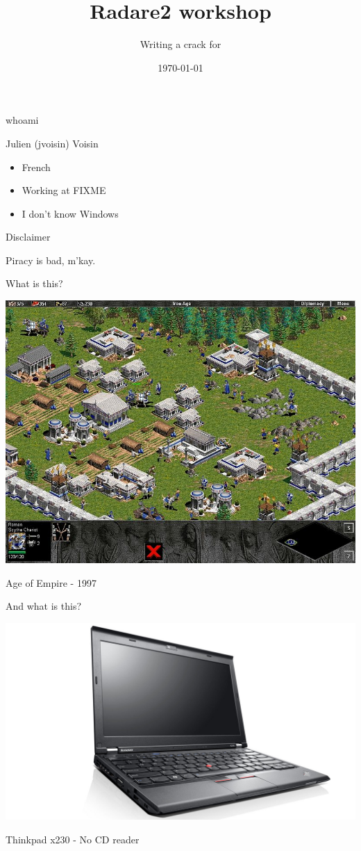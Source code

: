 \documentclass{beamer}
\title{Radare2 workshop}
\author{Writing a crack for \blackout{Age of Empire} }
\date{\today}
\institute{hack.lu 2015}
\begin{document}
\maketitle

\begin{frame}{whoami}
	\begin{block}{Julien (jvoisin) Voisin}
	\begin{itemize}
		\item French
		\item Working at FIXME
		\item I don't know Windows
	\end{itemize}
	\end{block}
\end{frame}

\begin{frame}{Disclaimer}
	\begin{center}
		Piracy is \alert{bad}, m'kay.
	\end{center}
\end{frame}

\begin{frame}{What is this?}
	\begin{center}
		\includegraphics[width=.9\textwidth]{aoe.jpg}
	\end{center}
	\pause
	Age of Empire - 1997
\end{frame}

\begin{frame}{And what is this?}
	\begin{center}
		\includegraphics[width=.9\textwidth]{x230.jpg}
	\end{center}
	Thinkpad x230 - No CD reader
\end{frame}
\end{document}
